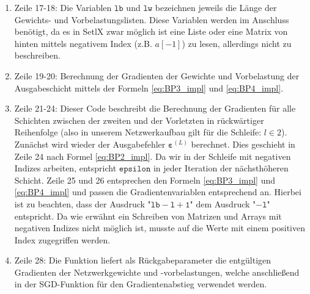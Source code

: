 \begin{enumerate}
\item Zeile 17-18: Die Variablen $\mathtt{lb}$ und $\mathtt{lw}$ bezeichnen jeweils die Länge der Gewichts- und Vorbelastungslisten. Diese Variablen werden im Anschluss benötigt, da es in SetlX zwar möglich ist eine Liste oder eine Matrix von hinten mittels negativem Index (z.B. $a[-1]$) zu lesen, allerdings nicht zu beschreiben.
\item Zeile 19-20: Berechnung der Gradienten der Gewichte und Vorbelastung der Ausgabeschicht mittels der Formeln \eqref{eq:BP3_impl} und \eqref{eq:BP4_impl}.
\item Zeile 21-24: Dieser Code beschreibt die Berechnung der Gradienten für alle Schichten zwischen der zweiten und der Vorletzten in rückwärtiger Reihenfolge (also in unserem Netzwerkaufbau gilt für die Schleife: $l \in {2}$). Zunächst wird wieder der Ausgabefehler $\boldsymbol{\varepsilon}^{(L)}$ berechnet. Dies geschieht in Zeile 24 nach Formel \eqref{eq:BP2_impl}. Da wir in der Schleife mit negativen Indizes arbeiten, entspricht $\mathtt{epsilon}$ in jeder Iteration der nächsthöheren Schicht. Zeile 25 und 26 entsprechen den Formeln \eqref{eq:BP3_impl} und \eqref{eq:BP4_impl} und passen die Gradientenvariablen entsprechend an. Hierbei ist zu beachten, dass der Ausdruck "$\mathtt{lb-l+1}$" dem Ausdruck "$\mathtt{-l}$" entspricht. Da wie erwähnt ein Schreiben von Matrizen und Arrays mit negativen Indizes nicht möglich ist, musste auf die Werte mit einem positiven Index zugegriffen werden.
\item Zeile 28: Die Funktion liefert als Rückgabeparameter die entgültigen Gradienten der Netzwerkgewichte und -vorbelastungen, welche anschließend in der SGD-Funktion für den Gradientenabstieg verwendet werden.
\end{enumerate}

